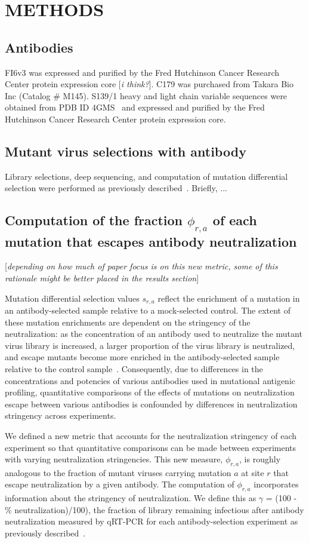 \documentclass[11pt]{article}
\newcommand{\comment}[1]{{\color{red}[\textsl{#1}]}}
\begin{document}
\section*{METHODS}
\subsection*{Antibodies}
FI6v3 was expressed and purified by the Fred Hutchinson Cancer Research Center protein expression core \comment{i think?}.
C179 was purchased from Takara Bio Inc (Catalog \# M145).
S139/1 heavy and light chain variable sequences were obtained from PDB ID 4GMS~\cite{lee2012heterosubtypic} and expressed and purified by the Fred Hutchinson Cancer Research Center protein expression core.

\subsection*{Mutant virus selections with antibody}
Library selections, deep sequencing, and computation of mutation differential selection were performed as previously described~\cite{doud2017complete}. Briefly, ...

\subsection*{Computation of the fraction $\phi_{r,a}$ of each mutation that escapes antibody neutralization}
\comment{depending on how much of paper focus is on this new metric, some of this rationale might be better placed in the results section}

Mutation differential selection values $s_{r,a}$ reflect the enrichment of a mutation in an antibody-selected sample relative to a mock-selected control. 
The extent of these mutation enrichments are dependent on the stringency of the neutralization: as the concentration of an antibody used to neutralize the mutant virus library is increased, a larger proportion of the virus library is neutralized, and escape mutants become more enriched in the antibody-selected sample relative to the control sample~\cite{doud2017complete}.
Consequently, due to differences in the concentrations and potencies of various antibodies used in mutational antigenic profiling, quantitative comparisons of the effects of mutations on neutralization escape between various antibodies is confounded by differences in neutralization stringency across experiments.

We defined a new metric that accounts for the neutralization stringency of each experiment so that quantitative comparisons can be made between experiments with varying neutralization stringencies.
This new measure, $\phi_{r,a}$, is roughly analogous to the fraction of mutant viruses carrying mutation $a$ at site $r$ that escape neutralization by a given antibody.
The computation of $\phi_{r,a}$ incorporates information about the stringency of neutralization. 
We define this as  $\gamma$ = (100 - \% neutralization)/100), the fraction of library remaining infectious after antibody neutralization measured by qRT-PCR for each antibody-selection experiment as previously described~\cite{doud2017complete}.
\end{document}
